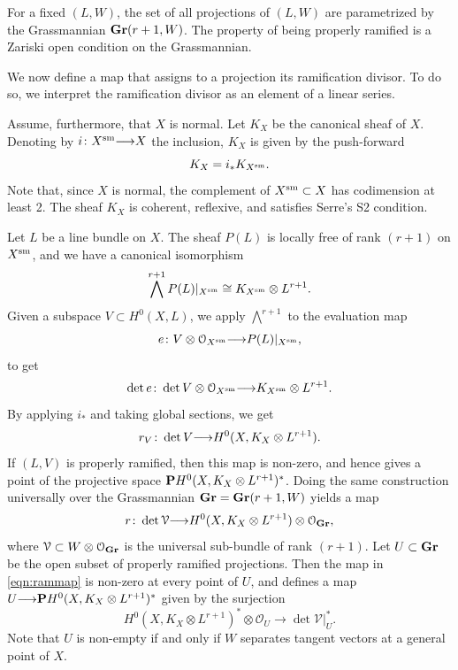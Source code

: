 \documentclass[11pt,reqno]{amsart}
\theoremstyle{plain}
\theoremstyle{definition}
\theoremstyle{remark}
\numberwithin{equation}{section}
\renewcommand{\to}{{\longrightarrow}}
\numberwithin{equation}{section}
\renewcommand{\O}{\mathcal O}
\begin{document}
For a fixed $(L, W)$, the set of all projections of $(L, W)$ are parametrized by the Grassmannian $\Gr(r+1, W)$.
The property of being properly ramified is a Zariski open condition on the Grassmannian.

We now define a map that assigns to a projection its ramification divisor.
To do so, we interpret the ramification divisor as an element of a linear series.

Assume, furthermore, that $X$ is normal.
Let $K_X$ be the canonical sheaf of $X$.
Denoting by $i \from X^{\rm sm} \to X$ the inclusion, $K_X$ is given by the push-forward
\[ K_X = i_* K_{X^{\rm sm}}.\]
Note that, since $X$ is normal, the complement of $X^{\rm sm} \subset X$ has codimension at least 2.
The sheaf $K_X$ is coherent, reflexive, and satisfies Serre's S2 condition.

Let $L$ be a line bundle on $X$.
The sheaf $P(L)$ is locally free of rank $(r+1)$ on $X^{\rm sm}$, and we have a canonical isomorphism
\[ \bigwedge^{r+1} P(L) |_{X^{\rm sm}} \cong K_{X^{\rm sm}} \otimes L^{r+1}.\]
Given a subspace $V \subset H^0(X, L)$, we apply $\bigwedge^{r+1}$ to the evaluation map
\[ e \from V \otimes \O_{X^{\rm sm}} \to P(L)|_{X^{\rm sm}},\]
to get
\[ \det e \from \det V \otimes \O_{X^{\rm sm}} \to K_{X^{\rm sm}} \otimes L^{r+1}. \]
By applying $i_*$ and taking global sections, we get
\begin{equation}\label{eqn:ramsection}
  r_V \from \det V \to H^0(X, K_X \otimes L^{r+1}).
\end{equation}
If $(L, V)$ is properly ramified, then this map is non-zero, and hence gives a point of the projective space $\P H^0(X, K_X \otimes L^{r+1})^*$.
Doing the same construction universally over the Grassmannian $\Gr = \Gr(r+1, W)$ yields a map
\begin{equation}\label{eqn:rammap}
  r \from \det \mathcal V \to H^0(X, K_X \otimes L^{r+1}) \otimes \O_{\Gr},
\end{equation}
where $\mathcal V \subset W \otimes \O_{\Gr}$ is the universal sub-bundle of rank $(r+1)$.
Let $U \subset \Gr$ be the open subset of properly ramified projections.
Then the map in \eqref{eqn:rammap} is non-zero at every point of $U$, and defines a map $U \to \P H^0(X, K_X \otimes L^{r+1})^*$ given by the surjection
\begin{equation}\label{eqn:rammapfamily}
  H^0(X, K_X \otimes L^{r+1})^* \otimes \O_{U} \to \det \mathcal V|_U^*.
\end{equation}
Note that $U$ is non-empty if and only if $W$ separates tangent vectors at a general point of $X$.
\end{document}
